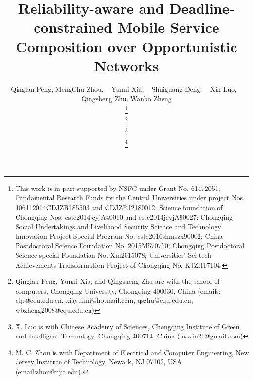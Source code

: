 \documentclass[journal]{IEEEtran}
\begin{document}
\title{Reliability-aware and Deadline-constrained Mobile Service Composition over Opportunistic Networks}

\author{Qinglan Peng,
        MengChu Zhou, ~
        Yunni Xia{\color{red}{*}}, ~
        Shuiguang Deng, ~
        Xin Luo, ~
        Qingsheng Zhu,
        Wanbo Zheng


\thanks{This work is in part supported by NSFC under Grant No. 61472051; Fundamental Research Funds for the Central Universities under project Nos. 106112014CDJZR185503 and CDJZR12180012; Science foundation of
Chongqing Nos. cstc2014jcyjA40010 and cstc2014jcyjA90027; Chongqing Social Undertakings and Livelihood Security Science and Technology Innovation Project Special Program No. cstc2016shmszx90002; China Postdoctoral Science Foundation No. 2015M570770; Chongqing Postdoctoral Science special Foundation No. Xm2015078; Universities’ Sci-tech Achievements Transformation Project of Chongqing No. KJZH17104. {\color{blue}{Yunni Xia is the corresponding author of this work.}}}

\thanks{Qinglan Peng, Yunni Xia, and Qingsheng Zhu are with the school of computers, Chongqing University, Chongqing 400030, China (emails: qlp@cqu.edu.cn, xiayunni@hotmail.com, qszhu@cqu.edu.cn, wbzheng2008@cqu.edu.cn)}

\thanks{X. Luo is with Chinese Academy of Sciences, Chongqing Institute of Green and Intelligent
Technology, Chongqing 400714, China (luoxin21@gmail.com)}

\thanks{M. C. Zhou is with Department of Electrical and Computer Engineering, New Jersey Institute of Technology, Newark, NJ 07102, USA (email:zhou@njit.edu).}


}




\maketitle
\end{document}
